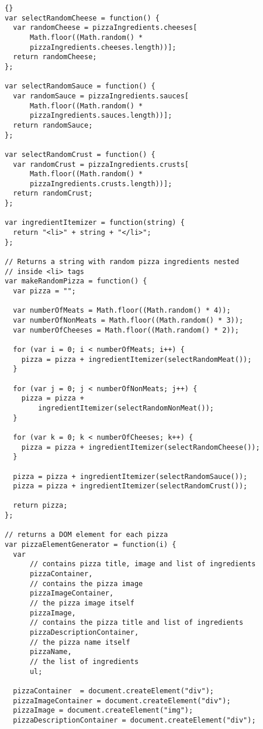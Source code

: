 \documentclass[twoside]{article}
\begin{document}
\begin{lstlisting}{}
var selectRandomCheese = function() {
  var randomCheese = pizzaIngredients.cheeses[
      Math.floor((Math.random() *
      pizzaIngredients.cheeses.length))];
  return randomCheese;
};

var selectRandomSauce = function() {
  var randomSauce = pizzaIngredients.sauces[
      Math.floor((Math.random() *
      pizzaIngredients.sauces.length))];
  return randomSauce;
};

var selectRandomCrust = function() {
  var randomCrust = pizzaIngredients.crusts[
      Math.floor((Math.random() *
      pizzaIngredients.crusts.length))];
  return randomCrust;
};

var ingredientItemizer = function(string) {
  return "<li>" + string + "</li>";
};

// Returns a string with random pizza ingredients nested
// inside <li> tags
var makeRandomPizza = function() {
  var pizza = "";

  var numberOfMeats = Math.floor((Math.random() * 4));
  var numberOfNonMeats = Math.floor((Math.random() * 3));
  var numberOfCheeses = Math.floor((Math.random() * 2));

  for (var i = 0; i < numberOfMeats; i++) {
    pizza = pizza + ingredientItemizer(selectRandomMeat());
  }

  for (var j = 0; j < numberOfNonMeats; j++) {
    pizza = pizza + 
        ingredientItemizer(selectRandomNonMeat());
  }

  for (var k = 0; k < numberOfCheeses; k++) {
    pizza = pizza + ingredientItemizer(selectRandomCheese());
  }

  pizza = pizza + ingredientItemizer(selectRandomSauce());
  pizza = pizza + ingredientItemizer(selectRandomCrust());

  return pizza;
};

// returns a DOM element for each pizza
var pizzaElementGenerator = function(i) {
  var 
      // contains pizza title, image and list of ingredients
      pizzaContainer,
      // contains the pizza image
      pizzaImageContainer,
      // the pizza image itself
      pizzaImage,
      // contains the pizza title and list of ingredients
      pizzaDescriptionContainer,
      // the pizza name itself
      pizzaName,
      // the list of ingredients
      ul;

  pizzaContainer  = document.createElement("div");
  pizzaImageContainer = document.createElement("div");
  pizzaImage = document.createElement("img");
  pizzaDescriptionContainer = document.createElement("div");


\end{lstlisting}
\end{document}
